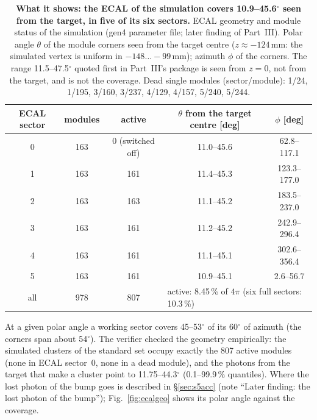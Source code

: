 \documentclass[11pt,a4paper]{article}
\begin{document}
\begin{table}[H]
\centering
\caption{\textbf{What it shows: the ECAL of the simulation covers 10.9--45.6$^\circ$ seen from the target, in five of its
six sectors.} ECAL geometry and module status of the simulation (gen4 parameter file; later finding of Part~III). Polar angle
$\theta$ of the module corners seen from the target centre ($z\approx-124$\,mm: the simulated vertex is uniform in
$-148\ldots-99$\,mm); azimuth $\phi$ of the corners. The range 11.5--47.5$^\circ$ quoted first in Part~III's package is
seen from $z=0$, not from the target, and is not the coverage. Dead single modules (sector/module): 1/24, 1/195, 3/160,
3/237, 4/129, 4/157, 5/240, 5/244.}
\label{tab:ecalgeo}
\small
\begin{tabular}{@{}c c c c c@{}}
\toprule
ECAL sector & modules & active & $\theta$ from the target centre [deg] & $\phi$ [deg] \\
\midrule
0 & 163 & 0 (switched off) & 11.0--45.6 & 62.8--117.1 \\
1 & 163 & 161 & 11.4--45.3 & 123.3--177.0 \\
2 & 163 & 163 & 11.1--45.2 & 183.5--237.0 \\
3 & 163 & 161 & 11.2--45.2 & 242.9--296.4 \\
4 & 163 & 161 & 11.1--45.1 & 302.6--356.4 \\
5 & 163 & 161 & 10.9--45.1 & 2.6--56.7 \\
\midrule
all & 978 & 807 & \multicolumn{2}{l}{active: 8.45\,\% of $4\pi$ (six full sectors: 10.3\,\%)} \\
\bottomrule
\end{tabular}
\end{table}

At a given polar angle a working sector covers 45--53$^\circ$ of its 60$^\circ$ of azimuth (the corners span about
54$^\circ$). The verifier checked the geometry empirically: the simulated clusters of the standard set occupy exactly the
807 active modules (none in ECAL sector~0, none in a dead module), and the photons from the target that make a cluster point
to 11.75--44.3$^\circ$ (0.1--99.9\,\% quantiles). Where the lost photon of the bump goes is described in
\S\ref{sec:s5acc} (note ``Later finding: the lost photon of the bump''); Fig.~\ref{fig:ecalgeo} shows its polar angle
against the coverage.
\end{document}
